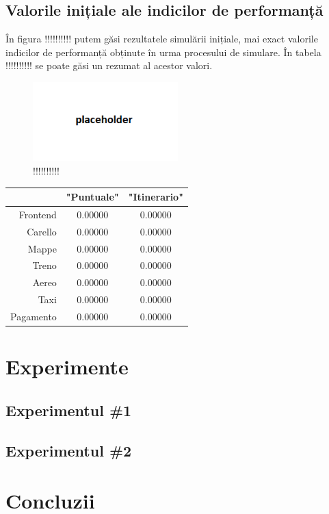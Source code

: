 \documentclass[12pt]{article}
\begin{document}
        \subsection{Valorile inițiale ale indicilor de performanță}
            În figura !!!!!!!!!! putem găsi rezultatele simulării inițiale, mai exact valorile indicilor de performanță obținute în urma procesului de simulare. În tabela !!!!!!!!!! se poate găsi un rezumat al acestor valori.
            \pagebreak

            \begin{figure}[!h]
                \centering
                \includegraphics[width=0.5\textwidth]{images/initial_results.png}
                \caption{!!!!!!!!!!}
            \end{figure}

            \begin{table}[!h]
                \centering
                \begin{tabular}{r|cc}
                    \multicolumn{1}{c|}{} & "Puntuale" & "Itinerario" \\ \hline
                    Frontend              & 0.00000    & 0.00000      \\
                    Carello               & 0.00000    & 0.00000      \\
                    Mappe                 & 0.00000    & 0.00000      \\
                    Treno                 & 0.00000    & 0.00000      \\
                    Aereo                 & 0.00000    & 0.00000      \\
                    Taxi                  & 0.00000    & 0.00000      \\
                    Pagamento             & 0.00000    & 0.00000     
                \end{tabular}
            \end{table}
            \pagebreak


    \section{Experimente}

        \subsection{Experimentul \#1}
            \lipsum[1-2]
        
        \subsection{Experimentul \#2}
            \lipsum[1-2]

    \section{Concluzii}
        \lipsum[1-2]
\end{document}
